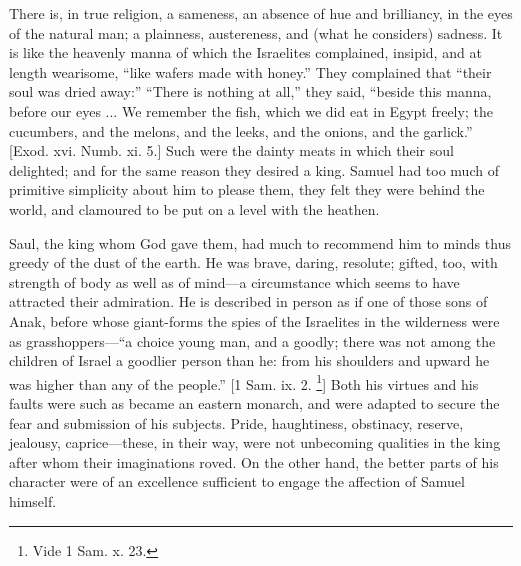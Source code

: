 There is, in true religion, a sameness, an absence of hue and
brilliancy, in the eyes of the natural man; a plainness, austereness,
and (what he considers) sadness. It is like the heavenly manna of
which the Israelites complained, insipid, and at length wearisome,
``like wafers made with honey.'' They complained that
``their soul was dried away:'' ``There is nothing at
all,'' they said, ``beside this manna, before our eyes ... We
remember the fish, which we did eat in Egypt freely; the cucumbers,
and the melons, and the leeks, and the onions, and the garlick.''
[Exod. xvi. Numb. xi. 5.] Such were the dainty meats in which their
soul delighted; and for the same reason they desired a king. Samuel
had too much of primitive simplicity about him to please them, they
felt they were behind the world, and clamoured to be put on a level
with the heathen.

Saul, the king whom God gave them, had much to recommend him to
minds thus greedy of the dust of the earth. He was brave, daring,
resolute; gifted, too, with strength of body as well as of mind—a
circumstance which seems to have attracted their admiration. He is
described in person as if one of those sons of Anak, before whose
giant-forms the spies of the Israelites in the wilderness were as
grasshoppers—``a choice young man, and a goodly; there was not
among the children of Israel a goodlier person than he: from his
shoulders and upward he was higher than any of the people.'' [1
Sam. ix. 2. \footnote{Vide 1 Sam. x. 23.}] Both his
virtues and his faults were such as became an eastern monarch, and
were adapted to secure the fear and submission of his subjects. Pride,
haughtiness, obstinacy, reserve, jealousy, caprice—these, in their
way, were not unbecoming qualities in the king after whom their
imaginations roved. On the other hand, the better parts of his
character were of an excellence sufficient to engage the affection of
Samuel himself.

